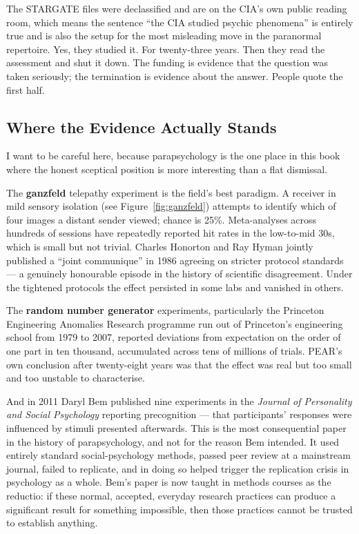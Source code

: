 \begin{funfact}
The STARGATE files were declassified and are on the CIA's own public reading room, which means the
sentence ``the CIA studied psychic phenomena'' is entirely true and is also the setup for the most
misleading move in the paranormal repertoire. Yes, they studied it. For twenty-three years. Then
they read the assessment and shut it down. The funding is evidence that the question was taken
seriously; the termination is evidence about the answer. People quote the first half.
\end{funfact}

\subsection{Where the Evidence Actually Stands}

I want to be careful here, because parapsychology is the one place in this book where the honest
sceptical position is more interesting than a flat dismissal.

The \textbf{ganzfeld} telepathy experiment is the field's best paradigm. A receiver in mild sensory isolation (see Figure~\ref{fig:ganzfeld}) attempts to identify which of four images a distant sender viewed; chance is 25\%.
Meta-analyses across hundreds of sessions have repeatedly reported hit rates in the low-to-mid 30s,
which is small but not trivial. Charles Honorton and Ray Hyman jointly published a ``joint
communique'' in 1986 agreeing on stricter protocol standards --- a genuinely honourable episode in
the history of scientific disagreement. Under the tightened protocols the effect persisted in some
labs and vanished in others.

The \textbf{random number generator} experiments, particularly the Princeton Engineering Anomalies
Research programme run out of Princeton's engineering school from 1979 to 2007, reported deviations
from expectation on the order of one part in ten thousand, accumulated across tens of millions of
trials. PEAR's own conclusion after twenty-eight years was that the effect was real but too small
and too unstable to characterise.

And in 2011 Daryl Bem published nine experiments in the \emph{Journal of Personality and Social
Psychology} reporting precognition --- that participants' responses were influenced by stimuli
presented afterwards. This is the most consequential paper in the history of parapsychology, and not
for the reason Bem intended. It used entirely standard social-psychology methods, passed peer review
at a mainstream journal, failed to replicate, and in doing so helped trigger the replication crisis
in psychology as a whole. Bem's paper is now taught in methods courses as the reductio: if these
normal, accepted, everyday research practices can produce a significant result for something
impossible, then those practices cannot be trusted to establish anything.

